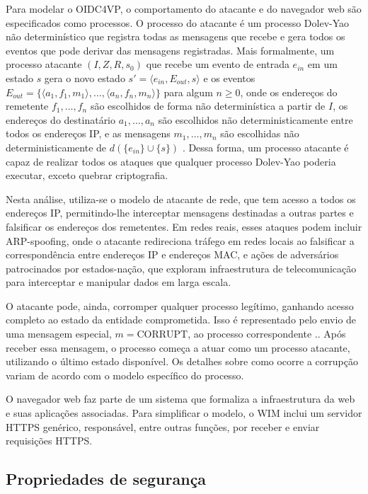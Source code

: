 Para modelar o \acs{OIDC4VP}, o comportamento do atacante e do navegador web são especificados como processos. 
O processo do atacante é um processo Dolev-Yao não determinístico que registra todas as mensagens que recebe e gera todos os eventos que pode derivar das mensagens registradas. 
Mais formalmente, um processo atacante $(I, Z, R, s_0)$ que recebe um evento de entrada $e_{in}$ em um estado $s$ gera o novo estado $s' = \langle e_{in}, E_{out}, s \rangle$ e os eventos 
$E_{out} = \{ \langle a_1, f_1, m_1 \rangle, \ldots, \langle a_n, f_n, m_n \rangle \}$ 
para algum $n \geq 0$, onde os endereços do remetente $f_1, \ldots, f_n$ são escolhidos de forma não determinística a partir de $I$, os endereços do destinatário $a_1, \ldots, a_n$ são escolhidos não deterministicamente entre todos os endereços IP, e as mensagens $m_1, \ldots, m_n$ são escolhidas não deterministicamente de $d(\{e_{in}\} \cup \{s\})$ \cite[Seção 2.5]{FettKS14}.
Dessa forma, um processo atacante é capaz de realizar todos os ataques que qualquer processo Dolev-Yao poderia executar, exceto quebrar criptografia.

Nesta análise, utiliza-se o modelo de atacante de rede, que tem acesso a todos os endereços IP, permitindo-lhe interceptar mensagens destinadas a outras partes e falsificar os endereços dos remetentes. Em redes reais, esses ataques podem incluir ARP-spoofing, onde o atacante redireciona tráfego em redes locais ao falsificar a correspondência entre endereços IP e endereços MAC, e ações de adversários patrocinados por estados-nação, que exploram infraestrutura de telecomunicação para interceptar e manipular dados em larga escala.

O atacante pode, ainda, corromper qualquer processo legítimo, ganhando acesso completo ao estado da entidade comprometida.
Isso é representado pelo envio de uma mensagem especial, $m = \text{CORRUPT}$, ao processo correspondente \cite[Seção 2.5]{FettKS14}.. Após receber essa mensagem, o processo começa a atuar como um processo atacante, utilizando o último estado disponível. Os detalhes sobre como ocorre a corrupção variam de acordo com o modelo específico do processo.


O navegador web faz parte de um sistema que formaliza a infraestrutura da web e suas aplicações associadas. Para simplificar o modelo, o \acs{WIM} inclui um servidor HTTPS genérico, responsável, entre outras funções, por receber e enviar requisições HTTPS.



\subsection{Propriedades de segurança}\label{subsection:properties-of-formal-analysis}


